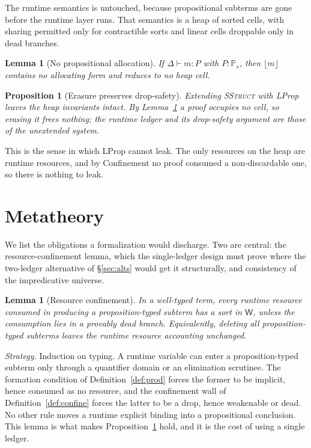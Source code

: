 \documentclass[11pt]{article}
\newcommand{\Wk}{\mathsf{W}}
\newcommand{\Prop}[1]{\mathbb{P}_{#1}}            %
\newcommand{\erase}[1]{\lfloor #1 \rfloor}
\newcommand{\smdsh}{\mathrel{\vdash}}
\theoremstyle{definition}
\theoremstyle{plain}
\newtheorem{lemma}[definition]{Lemma}
\newtheorem{proposition}[definition]{Proposition}
\begin{document}
The runtime semantics is untouched, because propositional subterms are gone before
the runtime layer runs. That semantics is a heap of sorted cells, with sharing
permitted only for contractible sorts and linear cells droppable only in dead
branches.

\begin{lemma}[No propositional allocation]\label{lem:noalloc}
If $\Delta\smdsh m:P$ with $P:\Prop{s}$, then $\erase{m}$ contains no allocating
form and reduces to no heap cell.
\end{lemma}

\begin{proposition}[Erasure preserves drop-safety]\label{prop:dropsafe}
Extending \textsc{SStruct} with \textsf{LProp} leaves the heap invariants intact.
By Lemma~\ref{lem:noalloc} a proof occupies no cell, so erasing it frees nothing;
the runtime ledger and its drop-safety argument are those of the unextended
system.
\end{proposition}

This is the sense in which \textsf{LProp} cannot leak. The only resources on the
heap are runtime resources, and by Confinement no proof consumed a non-discardable
one, so there is nothing to leak.

\section{Metatheory}\label{sec:meta}

We list the obligations a formalization would discharge. Two are central: the
resource-confinement lemma, which the single-ledger design must prove where the
two-ledger alternative of \S\ref{sec:alts} would get it structurally, and
consistency of the impredicative universe.

\begin{lemma}[Resource confinement]\label{lem:confine}
In a well-typed term, every runtime resource consumed in producing a
proposition-typed subterm has a sort in $\Wk$, unless the consumption lies in a
provably dead branch. Equivalently, deleting all proposition-typed subterms
leaves the runtime resource accounting unchanged.
\end{lemma}
\noindent\emph{Strategy.} Induction on typing. A runtime variable can enter a
proposition-typed subterm only through a quantifier domain or an elimination
scrutinee. The formation condition of Definition~\ref{def:prod} forces the former
to be implicit, hence consumed as no resource, and the confinement wall of
Definition~\ref{def:confine} forces the latter to be a drop, hence weakenable or
dead. No other rule moves a runtime explicit binding into a propositional
conclusion. This lemma is what makes Proposition~\ref{prop:dropsafe} hold, and it
is the cost of using a single ledger.
\end{document}
